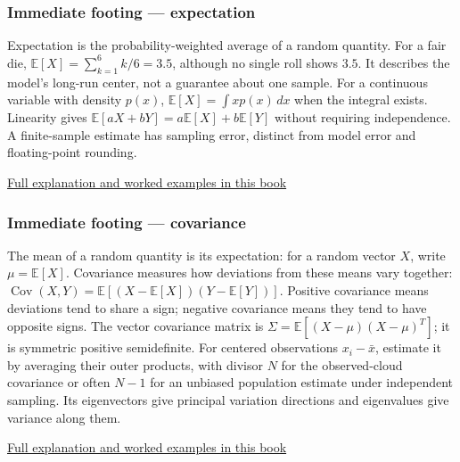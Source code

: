 \subsubsection{Immediate footing --- expectation}\label{01-foundations-i-ch018-immediate-footing-expectation}

\hypertarget{01-foundations-i-ch018-immediate-footing-expectation}{}

Expectation is the probability-weighted average of a random quantity. For a fair die, \(\mathbb{E}[X]=\sum_{k=1}^6 k/6=3.5\), although no single roll shows \(3.5\). It describes the model's long-run center, not a guarantee about one sample. For a continuous variable with density \(p(x)\), \(\mathbb{E}[X]=\int x p(x)\,dx\) when the integral exists. Linearity gives \(\mathbb{E}[aX+bY]=a\mathbb{E}[X]+b\mathbb{E}[Y]\) without requiring independence. A finite-sample estimate has sampling error, distinct from model error and floating-point rounding.

\hyperref[02-foundations-ii-ch023-expected-values-describe-centers-covariance-describes-dependence]{Full explanation and worked examples in this book}

\subsubsection{Immediate footing --- covariance}\label{01-foundations-i-ch018-immediate-footing-covariance}

\hypertarget{01-foundations-i-ch018-immediate-footing-covariance}{}

The mean of a random quantity is its expectation: for a random vector \(X\), write \(\mu=\mathbb{E}[X]\). Covariance measures how deviations from these means vary together: \(\operatorname{Cov}(X,Y)=\mathbb{E}[(X-\mathbb{E}[X])(Y-\mathbb{E}[Y])]\). Positive covariance means deviations tend to share a sign; negative covariance means they tend to have opposite signs. The vector covariance matrix is \(\Sigma=\mathbb{E}[(X-\mu)(X-\mu)^T]\); it is symmetric positive semidefinite. For centered observations \(x_i-\bar{x}\), estimate it by averaging their outer products, with divisor \(N\) for the observed-cloud covariance or often \(N-1\) for an unbiased population estimate under independent sampling. Its eigenvectors give principal variation directions and eigenvalues give variance along them.

\hyperref[02-foundations-ii-ch023-expected-values-describe-centers-covariance-describes-dependence]{Full explanation and worked examples in this book}

